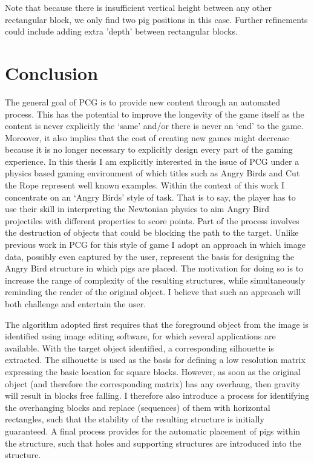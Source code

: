 \documentclass{dalthesis}
\begin{document}
Note that because there is insufficient vertical height between any other rectangular block, we only find two pig positions in this case. Further refinements could include adding extra 'depth' between rectangular blocks.

\chapter{Conclusion}\label{sec:conclusion}

The general goal of PCG is to provide new content through an automated process. This has the potential to improve the longevity of the game itself as the content is never explicitly the ‘same’ and/or there is never an ‘end’ to the game. Moreover, it also implies that the cost of creating new games might decrease because it is no longer necessary to explicitly design every part of the gaming experience. In this thesis I am explicitly interested in the issue of PCG under a physics based gaming environment of which titles such as Angry Birds and Cut the Rope represent well known examples. Within the context of this work I concentrate on an ‘Angry Birds’ style of task. That is to say, the player has to use their skill in interpreting the Newtonian physics to aim Angry Bird projectiles with different properties to score points. Part of the process involves the destruction of objects that could be blocking the path to the target. Unlike previous work in PCG for this style of game I adopt an approach in which image data, possibly even captured by the user, represent the basis for designing the Angry Bird structure in which pigs are placed. The motivation for doing so is to increase the range of complexity of the resulting structures, while simultaneously reminding the reader of the original object. I believe that such an approach will both challenge and entertain the user.

The algorithm adopted first requires that the foreground object from the image is identified using image editing software, for which several applications are available. With the target object identified, a corresponding silhouette is extracted. The silhouette is used as the basis for defining a low resolution matrix expressing the basic location for square blocks. However, as soon as the original object (and therefore the corresponding matrix) has any overhang, then gravity will result in blocks free falling. I therefore also introduce a process for identifying the overhanging blocks and replace (sequences) of them with horizontal rectangles, such that the stability of the resulting structure is initially guaranteed. A final process provides for the automatic placement of pigs within the structure, such that holes and supporting structures are introduced into the structure.
\end{document}
